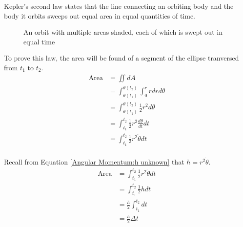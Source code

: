 \documentclass[../basicOrbitalDynamics.tex]{subfiles}
\begin{document}
Kepler's second law states that the line connecting an orbiting body and the body it orbits sweeps out equal area in equal quantities of time.
\begin{figure}[H]
    \centering

    \caption{An orbit with multiple areas shaded, each of which is swept out in equal time}
\end{figure}

To prove this law, the area will be found of a segment of the ellipse tranversed from $t_1$ to $t_2$.
\begin{align*}
    \text{Area} & =\iint{}dA                                               \\
                & = \int_{\theta(t_1)}^{\theta(t_2)}\int_{0}^{r}rdrd\theta \\
                & = \int_{\theta(t_1)}^{\theta(t_2)}\frac{1}{2}r^2d\theta  \\
                & = \int_{t_1}^{t_2}\frac{1}{2}r^2\frac{d\theta}{dt}dt     \\
                & = \int_{t_1}^{t_2}\frac{1}{2}r^2\dot{\theta}dt           \\
\end{align*}

Recall from Equation \eqref{Angular Momentum:h unknown} that $h=r^2\dot{\theta}$.
\begin{align*}
    \text{Area} & = \int_{t_1}^{t_2}\frac{1}{2}r^2\dot{\theta}dt \\
                & = \int_{t_1}^{t_2}\frac{1}{2}hdt               \\
                & = \frac{h}{2}\int_{t_1}^{t_2}dt                \\
                & = \frac{h}{2}\Delta{}t                         \\
\end{align*}
\end{document}
